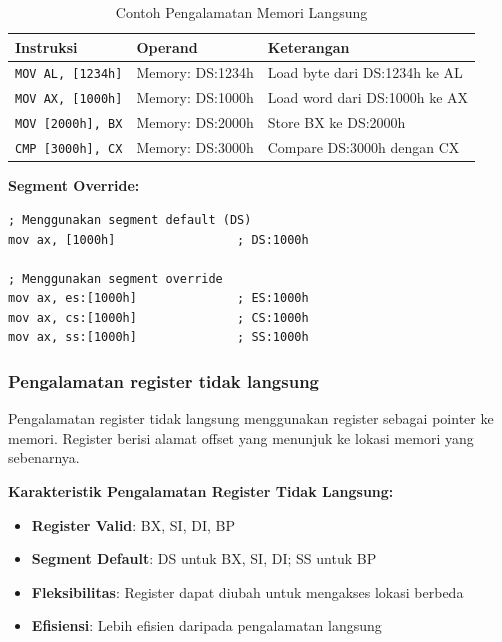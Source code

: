 \documentclass[../main.tex]{subfiles}
\begin{document}
\begin{table}[h]
\centering
\caption{Contoh Pengalamatan Memori Langsung}
\begin{tabular}{|p{4cm}|p{4cm}|p{7cm}|}
\hline
\textbf{Instruksi} & \textbf{Operand} & \textbf{Keterangan} \\
\hline
\texttt{MOV AL, [1234h]} & Memory: DS:1234h & Load byte dari DS:1234h ke AL \\
\hline
\texttt{MOV AX, [1000h]} & Memory: DS:1000h & Load word dari DS:1000h ke AX \\
\hline
\texttt{MOV [2000h], BX} & Memory: DS:2000h & Store BX ke DS:2000h \\
\hline
\texttt{CMP [3000h], CX} & Memory: DS:3000h & Compare DS:3000h dengan CX \\
\hline
\end{tabular}
\label{tab:direct-memory-addressing-examples}
\end{table}

\textbf{Segment Override:}
\begin{lstlisting}[language={[x86masm]Assembler}, caption=Segment Override dalam Pengalamatan Memori, label=lst:segment-override]
; Menggunakan segment default (DS)
mov ax, [1000h]                 ; DS:1000h

; Menggunakan segment override
mov ax, es:[1000h]              ; ES:1000h
mov ax, cs:[1000h]              ; CS:1000h
mov ax, ss:[1000h]              ; SS:1000h
\end{lstlisting}

\subsubsection{Pengalamatan register tidak langsung}
Pengalamatan register tidak langsung menggunakan register sebagai pointer ke memori. Register berisi alamat offset yang menunjuk ke lokasi memori yang sebenarnya.

\textbf{Karakteristik Pengalamatan Register Tidak Langsung:}
\begin{itemize}
    \item \textbf{Register Valid}: BX, SI, DI, BP
    \item \textbf{Segment Default}: DS untuk BX, SI, DI; SS untuk BP
    \item \textbf{Fleksibilitas}: Register dapat diubah untuk mengakses lokasi berbeda
    \item \textbf{Efisiensi}: Lebih efisien daripada pengalamatan langsung
\end{itemize}
\end{document}

